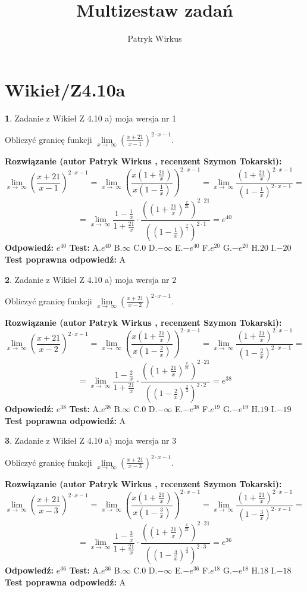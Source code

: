\documentclass[12pt, a4paper]{article}
\title{Multizestaw zadań}
\author{Patryk Wirkus}
\date{}
\theoremstyle{definition} %
\newtheorem{zad}{}
\newcommand{\kategoria}[1]{\section{#1}}
\newcommand{\zadStart}[1]{\begin{zad}#1\newline}
\newcommand{\zadStop}{\end{zad}}
\newcommand{\rozwStart}[2]{\noindent \textbf{Rozwiązanie (autor #1 , recenzent #2): }\newline}
\newcommand{\rozwStop}{\newline}
\newcommand{\odpStart}{\noindent \textbf{Odpowiedź:}\newline}
\newcommand{\odpStop}{\newline}
\newcommand{\testStart}{\noindent \textbf{Test:}\newline}
\newcommand{\testStop}{\newline}
\newcommand{\kluczStart}{\noindent \textbf{Test poprawna odpowiedź:}\newline}
\newcommand{\kluczStop}{\newline}
\begin{document}
\maketitle

\kategoria{Wikieł/Z4.10a}


\zadStart{Zadanie z Wikieł Z 4.10 a) moja wersja nr 1}

Obliczyć granicę funkcji  $\lim\limits_{x\to\ \infty}(\frac{x+21}{x-1})^{2\cdot x-1}$.
\zadStop
\rozwStart{Patryk Wirkus}{Szymon Tokarski}
$$\lim\limits_{x\to\ \infty}(\frac{x+21}{x-1})^{2\cdot x-1} = \lim\limits_{x\to\ \infty}(\frac{x(1+\frac{21}{x})}{x(1-\frac{1}{x})})^{2\cdot x-1}=\lim\limits_{x\to\ \infty}\frac{(1+\frac{21}{x})^{2\cdot x-1}}{(1-\frac{1}{x})^{2\cdot x-1}}=$$
$$=\lim\limits_{x\to\ \infty}\frac{1-\frac{1}{x}}{1+\frac{21}{x}}\cdot\frac{((1+\frac{21}{x})^{\frac{x}{21}})^{2\cdot21}}{((1-\frac{1}{x})^{\frac{x}{1}})^{2\cdot1}}=e^{40}$$
\rozwStop
\odpStart
$e^{40}$
\odpStop
\testStart
A.$e^{40}$ B.$\infty$ C.$0$ D.$-\infty$ E.$-e^{40}$
F.$e^{20}$ G.$-e^{20}$
H.$20$
I.$-20$
\testStop
\kluczStart
A
\kluczStop



\zadStart{Zadanie z Wikieł Z 4.10 a) moja wersja nr 2}

Obliczyć granicę funkcji  $\lim\limits_{x\to\ \infty}(\frac{x+21}{x-2})^{2\cdot x-1}$.
\zadStop
\rozwStart{Patryk Wirkus}{Szymon Tokarski}
$$\lim\limits_{x\to\ \infty}(\frac{x+21}{x-2})^{2\cdot x-1} = \lim\limits_{x\to\ \infty}(\frac{x(1+\frac{21}{x})}{x(1-\frac{2}{x})})^{2\cdot x-1}=\lim\limits_{x\to\ \infty}\frac{(1+\frac{21}{x})^{2\cdot x-1}}{(1-\frac{2}{x})^{2\cdot x-1}}=$$
$$=\lim\limits_{x\to\ \infty}\frac{1-\frac{2}{x}}{1+\frac{21}{x}}\cdot\frac{((1+\frac{21}{x})^{\frac{x}{21}})^{2\cdot21}}{((1-\frac{2}{x})^{\frac{x}{2}})^{2\cdot2}}=e^{38}$$
\rozwStop
\odpStart
$e^{38}$
\odpStop
\testStart
A.$e^{38}$ B.$\infty$ C.$0$ D.$-\infty$ E.$-e^{38}$
F.$e^{19}$ G.$-e^{19}$
H.$19$
I.$-19$
\testStop
\kluczStart
A
\kluczStop



\zadStart{Zadanie z Wikieł Z 4.10 a) moja wersja nr 3}

Obliczyć granicę funkcji  $\lim\limits_{x\to\ \infty}(\frac{x+21}{x-3})^{2\cdot x-1}$.
\zadStop
\rozwStart{Patryk Wirkus}{Szymon Tokarski}
$$\lim\limits_{x\to\ \infty}(\frac{x+21}{x-3})^{2\cdot x-1} = \lim\limits_{x\to\ \infty}(\frac{x(1+\frac{21}{x})}{x(1-\frac{3}{x})})^{2\cdot x-1}=\lim\limits_{x\to\ \infty}\frac{(1+\frac{21}{x})^{2\cdot x-1}}{(1-\frac{3}{x})^{2\cdot x-1}}=$$
$$=\lim\limits_{x\to\ \infty}\frac{1-\frac{3}{x}}{1+\frac{21}{x}}\cdot\frac{((1+\frac{21}{x})^{\frac{x}{21}})^{2\cdot21}}{((1-\frac{3}{x})^{\frac{x}{3}})^{2\cdot3}}=e^{36}$$
\rozwStop
\odpStart
$e^{36}$
\odpStop
\testStart
A.$e^{36}$ B.$\infty$ C.$0$ D.$-\infty$ E.$-e^{36}$
F.$e^{18}$ G.$-e^{18}$
H.$18$
I.$-18$
\testStop
\kluczStart
A
\kluczStop
\end{document}
